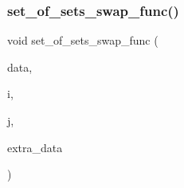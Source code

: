 \subsubsection{\texorpdfstring{set\+\_\+of\+\_\+sets\+\_\+swap\+\_\+func()}{set\_of\_sets\_swap\_func()}}
{\footnotesize\ttfamily void set\+\_\+of\+\_\+sets\+\_\+swap\+\_\+func (\begin{DoxyParamCaption}\item[{void $\ast$}]{data,  }\item[{\mbox{\hyperlink{galois_8h_a09fddde158a3a20bd2dcadb609de11dc}{I\+NT}}}]{i,  }\item[{\mbox{\hyperlink{galois_8h_a09fddde158a3a20bd2dcadb609de11dc}{I\+NT}}}]{j,  }\item[{void $\ast$}]{extra\+\_\+data }\end{DoxyParamCaption})}

